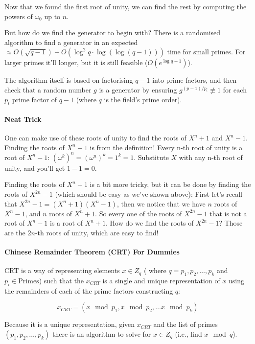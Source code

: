 Now that we found the first root of unity,
we can find the rest by computing the powers of $\omega_0$ up to $n$.


But how do we find the generator to begin with? 
There is a randomised algorithm to find a generator in an expected 
$\approx O(\sqrt{q-1})+O(\log^2{q}\cdot \log (\log(q-1)))$ time for small primes.
For larger primes it'll longer, but it is still feasible ($O(e^{\log q-1})$).

The algorithm itself is based on factorising $q-1$ into prime factors, and then
check that a random number $g$ is a generator by ensuring $g^{(p-1)/p_i} \not\equiv 1$
for each $p_i$ prime factor of $q-1$ (where $q$ is the field's prime order).


\paragraph{Neat Trick}
One can make use of these roots of unity to find the roots of $X^n+1$ and $X^n-1$.
Finding the roots of $X^n-1$ is from the definition! 
Every n-th root of unity is a root of $X^n-1$: $(\omega^k)^n=(\omega^n)^k=1^k=1$.
Substitute $X$ with any n-th root of unity, and you'll get $1-1=0$.

Finding the roots of $X^n+1$ is a bit more tricky,
but it can be done by finding the roots of $X^{2n}-1$ (which should be easy
as we've shown above):
First let's recall that $X^{2n}-1=(X^n+1)(X^n-1)$, then we notice that
we have $n$ roots of $X^n-1$,
and $n$ roots of $X^n+1$. So every one of the roots of $X^{2n}-1$ that is
not a root of $X^n-1$ is a root of $X^n+1$.
How do we find the roots of $X^{2n}-1$? Those are the $2n$-th roots of unity, 
which are easy to find!

\paragraph{Chinese Remainder Theorem (CRT) For Dummies}
CRT is a way of representing elements $x\in Z_q$ (
  where $q=p_1,p_2,\dots,p_k$ and $p_i\in\text{Primes}$)
such that the $x_{CRT}$ is a single and unique representation of $x$ using the 
remainders of each of the prime factors constructing $q$:

$$ x_{CRT} = (x\mod p_1, x\mod p_2 ,\dots x\mod p_k ) $$



Because it is a unique representation, given $x_{CRT}$ and the list of
 primes $(p_1,p_2,\dots,p_k)$ there is an algorithm to solve for $x \in Z_q$
 (i.e., find $x \mod q$).


